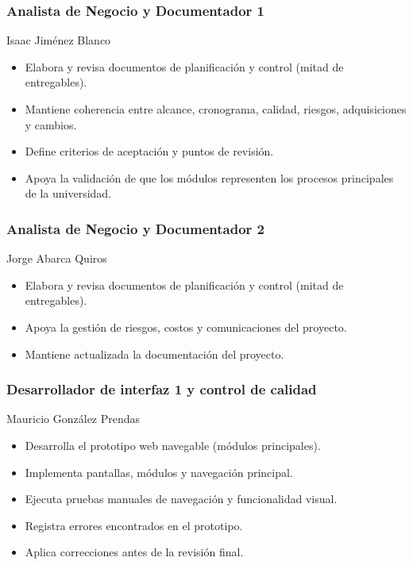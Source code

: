 \documentclass[11pt,spanish]{article}
\begin{document}
\subsubsection*{Analista de Negocio y Documentador 1}
Isaac Jiménez Blanco

\begin{itemize}
    \item Elabora y revisa documentos de planificación y control (mitad de entregables).
    \item Mantiene coherencia entre alcance, cronograma, calidad, riesgos, adquisiciones y cambios.
    \item Define criterios de aceptación y puntos de revisión.
    \item Apoya la validación de que los módulos representen los procesos principales de la universidad.
\end{itemize}

\subsubsection*{Analista de Negocio y Documentador 2}
Jorge Abarca Quiros

\begin{itemize}
    \item Elabora y revisa documentos de planificación y control (mitad de entregables).
    \item Apoya la gestión de riesgos, costos y comunicaciones del proyecto.
    \item Mantiene actualizada la documentación del proyecto.
\end{itemize}

\subsubsection*{Desarrollador de interfaz 1 y control de calidad}
Mauricio González Prendas

\begin{itemize}
    \item Desarrolla el prototipo web navegable (módulos principales).
    \item Implementa pantallas, módulos y navegación principal.
    \item Ejecuta pruebas manuales de navegación y funcionalidad visual.
    \item Registra errores encontrados en el prototipo.
    \item Aplica correcciones antes de la revisión final.
\end{itemize}
\end{document}
